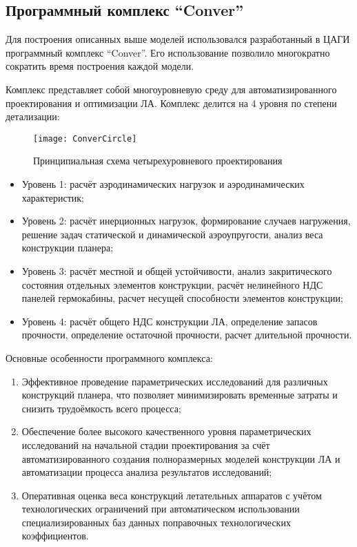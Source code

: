 \subsection{Программный комплекс ``Conver''}
\label{sec:Conver}

Для построения описанных выше моделей использовался разработанный в ЦАГИ программный комплекс ``Conver''. Его использование позволило многократно сократить время построения каждой модели. 

Комплекс представляет собой многоуровневую среду для автоматизированного проектирования и оптимизации ЛА. Комплекс делится на 4 уровня по степени детализации:



\begin{figure}[ht]
\centering
\texttt{[image: ConverCircle]} 
\caption{Принципиальная схема четырехуровневого проектирования}
\end{figure}



\begin{itemize}
\item Уровень 1: расчёт аэродинамических нагрузок и аэродинамических характеристик; 
\item Уровень 2: расчёт инерционных нагрузок, формирование случаев нагружения, решение задач статической и динамической аэроупругости, анализ веса конструкции планера;
\item Уровень 3: расчёт местной и общей устойчивости, анализ закритического состояния отдельных элементов конструкции, расчёт нелинейного НДС панелей гермокабины, расчет несущей способности элементов конструкции;
\item Уровень 4: расчёт общего НДС конструкции ЛА, определение запасов прочности, определение остаточной прочности, расчет длительной прочности.
\end{itemize}

Основные особенности программного комплекса:

\begin{enumerate}
\item Эффективное проведение параметрических исследований для различных конструкций планера, что позволяет минимизировать временные затраты и снизить трудоёмкость всего процесса;
\item Обеспечение более высокого качественного уровня параметрических исследований на начальной стадии проектирования за счёт автоматизированного создания полноразмерных моделей конструкции ЛА и автоматизации процесса анализа результатов исследований;
\item Оперативная оценка веса конструкций летательных аппаратов с учётом технологических ограничений при автоматическом использовании специализированных баз данных поправочных технологических коэффициентов.
\end{enumerate}

%